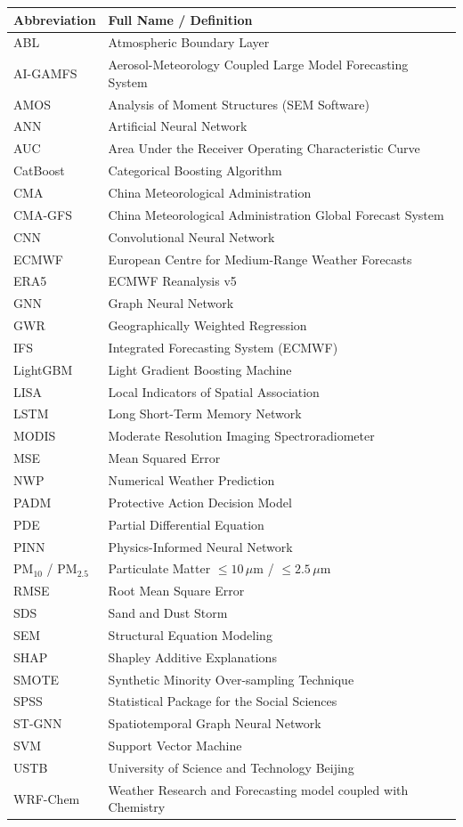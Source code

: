 \documentclass[12pt,a4paper,openany,twoside]{book}
\begin{document}
\begin{table}[H]
\centering
\begin{tabular}{ll}
\toprule
\textbf{Abbreviation} & \textbf{Full Name / Definition} \\
\midrule
ABL & Atmospheric Boundary Layer \\
AI-GAMFS & Aerosol-Meteorology Coupled Large Model Forecasting System \\
AMOS & Analysis of Moment Structures (SEM Software) \\
ANN & Artificial Neural Network \\
AUC & Area Under the Receiver Operating Characteristic Curve \\
CatBoost & Categorical Boosting Algorithm \\
CMA & China Meteorological Administration \\
CMA-GFS & China Meteorological Administration Global Forecast System \\
CNN & Convolutional Neural Network \\
ECMWF & European Centre for Medium-Range Weather Forecasts \\
ERA5 & ECMWF Reanalysis v5 \\
GNN & Graph Neural Network \\
GWR & Geographically Weighted Regression \\
IFS & Integrated Forecasting System (ECMWF) \\
LightGBM & Light Gradient Boosting Machine \\
LISA & Local Indicators of Spatial Association \\
LSTM & Long Short-Term Memory Network \\
MODIS & Moderate Resolution Imaging Spectroradiometer \\
MSE & Mean Squared Error \\
NWP & Numerical Weather Prediction \\
PADM & Protective Action Decision Model \\
PDE & Partial Differential Equation \\
PINN & Physics-Informed Neural Network \\
PM$_{10}$ / PM$_{2.5}$ & Particulate Matter $\le 10\,\mu\text{m}$ / $\le 2.5\,\mu\text{m}$ \\
RMSE & Root Mean Square Error \\
SDS & Sand and Dust Storm \\
SEM & Structural Equation Modeling \\
SHAP & Shapley Additive Explanations \\
SMOTE & Synthetic Minority Over-sampling Technique \\
SPSS & Statistical Package for the Social Sciences \\
ST-GNN & Spatiotemporal Graph Neural Network \\
SVM & Support Vector Machine \\
USTB & University of Science and Technology Beijing \\
WRF-Chem & Weather Research and Forecasting model coupled with Chemistry \\
\bottomrule
\end{tabular}
\end{table}
\end{document}
